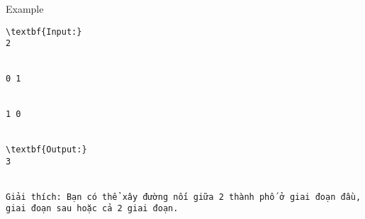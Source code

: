 Example
\begin{verbatim}
\textbf{Input:}
2


0 1


1 0


\textbf{Output:}
3


Giải thích: Bạn có thể xây đường nối giữa 2 thành phố ở giai đoạn đầu, giai đoạn sau hoặc cả 2 giai đoạn.\end{verbatim}